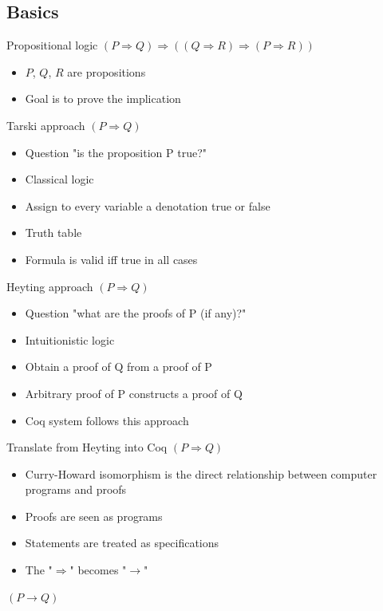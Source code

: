 \subsection{Basics}
\begin{frame}{Propositional logic}
	$(P \Rightarrow Q) \Rightarrow ((Q \Rightarrow R) \Rightarrow (P \Rightarrow R))$
	\begin{itemize}
		\item $P$, $Q$, $R$ are propositions
		\pause
		\item Goal is to prove the implication
	\end{itemize}
\end{frame}
\begin{frame}{Tarski approach}
	$(P \Rightarrow Q)$
	\begin{itemize}
		\item Question "is the proposition P true?"
		\pause
		\item Classical logic
		\pause
		\item Assign to every variable a denotation true or false
		\pause
		\item Truth table
		\pause		
		\item Formula is valid iff true in all cases
	\end{itemize}
\end{frame}
\begin{frame}{Heyting approach}
	$(P \Rightarrow Q)$
	\begin{itemize}
		\item Question "what are the proofs of P (if any)?"
		\pause
		\item Intuitionistic logic
		\pause
		\item Obtain a proof of Q from a proof of P
		\pause		
		\item Arbitrary proof of P constructs a proof of Q
		\pause
		\item Coq system follows this approach
	\end{itemize}
\end{frame}
\begin{frame}{Translate from Heyting into Coq}
	$(P \Rightarrow Q)$
	\begin{itemize}
		\item Curry-Howard isomorphism is the direct relationship between computer programs and proofs
		\pause
		\item Proofs are seen as programs
		\item Statements are treated as specifications
		\pause
		\item The "$\Rightarrow$" becomes "$\rightarrow$"
	\end{itemize}
	\pause
	$(P \rightarrow Q)$
\end{frame}
